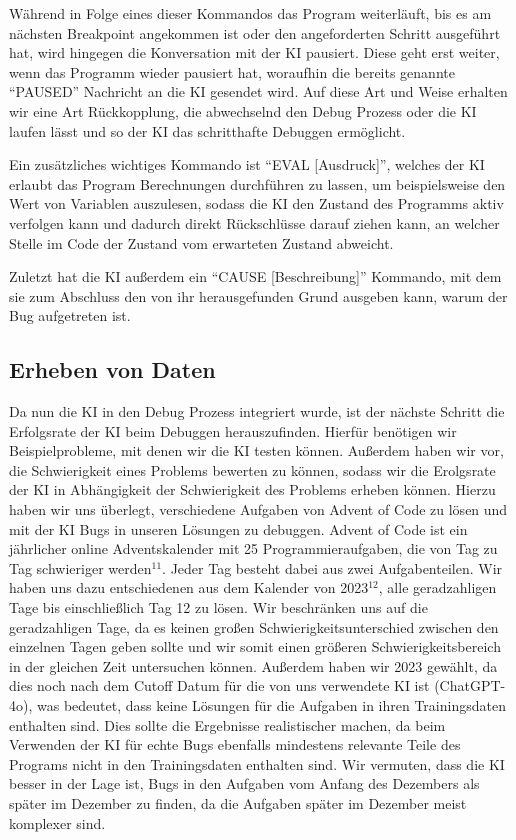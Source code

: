 \documentclass[a4paper,12pt,ngerman]{scrartcl}
\begin{document}
Während in Folge eines dieser Kommandos das Program weiterläuft, bis es am nächsten Breakpoint angekommen ist oder den angeforderten Schritt ausgeführt hat, wird hingegen die Konversation mit der KI pausiert. Diese geht erst weiter, wenn das Programm wieder pausiert hat, woraufhin die bereits genannte ``PAUSED'' Nachricht an die KI gesendet wird. Auf diese Art und Weise erhalten wir eine Art Rückkopplung, die abwechselnd den Debug Prozess oder die KI laufen lässt und so der KI das schritthafte Debuggen ermöglicht.

Ein zusätzliches wichtiges Kommando ist ``EVAL [Ausdruck]'', welches der KI erlaubt das Program Berechnungen durchführen zu lassen, um beispielsweise den Wert von Variablen auszulesen, sodass die KI den Zustand des Programms aktiv verfolgen kann und dadurch direkt Rückschlüsse darauf ziehen kann, an welcher Stelle im Code der Zustand vom erwarteten Zustand abweicht.

Zuletzt hat die KI außerdem ein ``CAUSE [Beschreibung]'' Kommando, mit dem sie zum Abschluss den von ihr herausgefunden Grund ausgeben kann, warum der Bug aufgetreten ist.

\subsection{Erheben von Daten}

Da nun die KI in den Debug Prozess integriert wurde, ist der nächste Schritt die Erfolgsrate der KI beim Debuggen herauszufinden. Hierfür benötigen wir Beispielprobleme, mit denen wir die KI testen können. Außerdem haben wir vor, die Schwierigkeit eines Problems bewerten zu können, sodass wir die Erolgsrate der KI in Abhängigkeit der Schwierigkeit des Problems erheben können. Hierzu haben wir uns überlegt, verschiedene Aufgaben von Advent of Code zu lösen und mit der KI Bugs in unseren Lösungen zu debuggen. Advent of Code ist ein jährlicher online Adventskalender mit 25 Programmieraufgaben, die von Tag zu Tag schwieriger werden$^{11}$. Jeder Tag besteht dabei aus zwei Aufgabenteilen. Wir haben uns dazu entschiedenen aus dem Kalender von 2023$^{12}$, alle geradzahligen Tage bis einschließlich Tag 12 zu lösen. Wir beschränken uns auf die geradzahligen Tage, da es keinen großen Schwierigkeitsunterschied zwischen den einzelnen Tagen geben sollte und wir somit einen größeren Schwierigkeitsbereich in der gleichen Zeit untersuchen können. Außerdem haben wir 2023 gewählt, da dies noch nach dem Cutoff Datum für die von uns verwendete KI ist (ChatGPT-4o), was bedeutet, dass keine Lösungen für die Aufgaben in ihren Trainingsdaten enthalten sind. Dies sollte die Ergebnisse realistischer machen, da beim Verwenden der KI für echte Bugs ebenfalls mindestens relevante Teile des Programs nicht in den Trainingsdaten enthalten sind. Wir vermuten, dass die KI besser in der Lage ist, Bugs in den Aufgaben vom Anfang des Dezembers als später im Dezember zu finden, da die Aufgaben später im Dezember meist komplexer sind.
\end{document}
